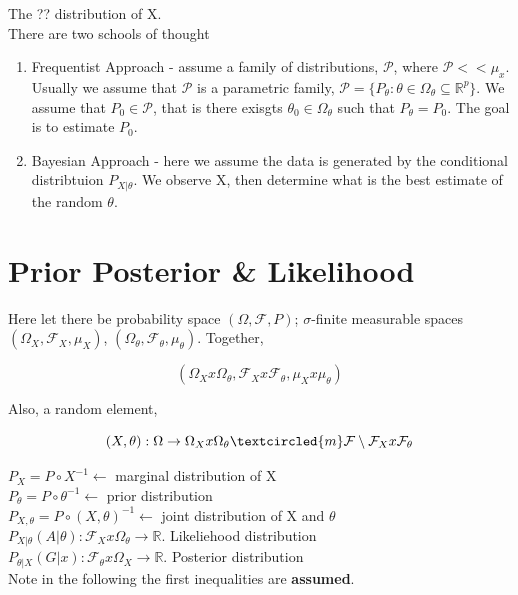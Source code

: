 \documentclass[11pt,fleqn]{book} %
\begin{document}
The ?? distribution of X. \\

There are two schools of thought

	\begin{enumerate}
		\item Frequentist Approach - assume a family of distributions, $\mathcal{P}$, where $\mathcal{P} << \mu_x$. Usually we assume that $\mathcal{P}$ is a parametric family, $\mathcal{P} = \{P_\theta: \theta \in \Omega_\theta \subseteq \mathbb{R}^p \}$. We assume that $P_0 \in \mathcal{P}$, that is there exisgts $\theta_0 \in \Omega_\theta$ such that $P_\theta = P_0$. The goal is to estimate $P_0$. 
		\item Bayesian Approach - here we assume the data is generated by the conditional distribtuion $P_{X|\theta}$. We observe X, then determine what is the best estimate of the random $\theta.$
\end{enumerate}


\section{Prior Posterior \& Likelihood}


Here let there be probability space $(\Omega, \mathcal{F}, P)$; $\sigma$-finite measurable spaces $(\Omega_X, \mathcal{F}_X, \mu_X)$, $(\Omega_\theta, \mathcal{F}_\theta, \mu_\theta)$. Together, 

		$$(\Omega_X x \Omega_\theta, \mathcal{F}_X x \mathcal{F}_\theta, \mu_X x \mu_\theta)$$ 


Also, a random element, 

		$$(X, \theta):\Omega \rightarrow \Omega_X x \Omega_\theta \textcircled{m} \mathcal{F}\setminus\mathcal{F}_X x \mathcal{F}_\theta$$


$P_X = P \circ X^{-1} \leftarrow$ marginal distribution of X\\
$P_\theta = P \circ \theta^{-1} \leftarrow$ prior distribution \\
$P_{X, \theta} = P \circ (X, \theta)^{-1} \leftarrow$ joint distribution of X and $\theta$\\
$P_{X|\theta}(A|\theta): \mathcal{F}_X x \Omega_\theta \rightarrow \mathbb{R}$. Likeliehood distribution\\
$P_{\theta|X}(G|x): \mathcal{F}_\theta x \Omega_X \rightarrow \mathbb{R}$. Posterior distribution\\


Note in the following the first inequalities are \textbf{assumed}.\\
\end{document}
